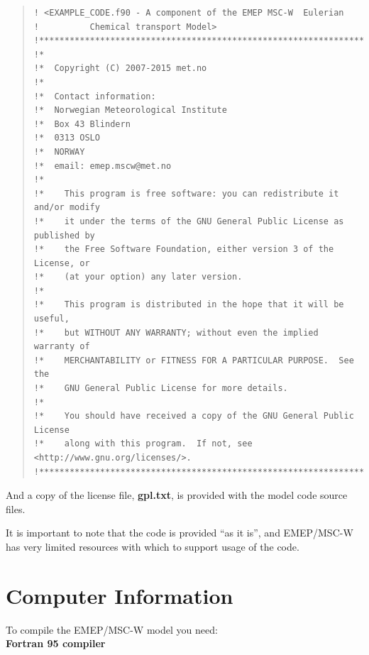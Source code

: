 \begin{quote}
\begin{footnotesize}
\begin{verbatim}
! <EXAMPLE_CODE.f90 - A component of the EMEP MSC-W  Eulerian
!          Chemical transport Model>
!*******************************************************************!
!*
!*  Copyright (C) 2007-2015 met.no
!*
!*  Contact information:
!*  Norwegian Meteorological Institute
!*  Box 43 Blindern
!*  0313 OSLO
!*  NORWAY
!*  email: emep.mscw@met.no
!*
!*    This program is free software: you can redistribute it and/or modify
!*    it under the terms of the GNU General Public License as published by
!*    the Free Software Foundation, either version 3 of the License, or
!*    (at your option) any later version.
!*
!*    This program is distributed in the hope that it will be useful,
!*    but WITHOUT ANY WARRANTY; without even the implied warranty of
!*    MERCHANTABILITY or FITNESS FOR A PARTICULAR PURPOSE.  See the
!*    GNU General Public License for more details.
!*
!*    You should have received a copy of the GNU General Public License
!*    along with this program.  If not, see <http://www.gnu.org/licenses/>.
!*******************************************************************!
\end{verbatim}
\end{footnotesize}
\end{quote}

And a copy of the license file, {\bf gpl.txt}, is provided with the
model code source files.

\noindent It is important to note that the code is provided ``as it is'', 
and EMEP/MSC-W has very limited resources with which to support
usage of the code. 


\newpage

\section{Computer Information}
\label{sec:compinf}

To compile the EMEP/MSC-W model you need:\\

\textbf{Fortran 95 compiler}

